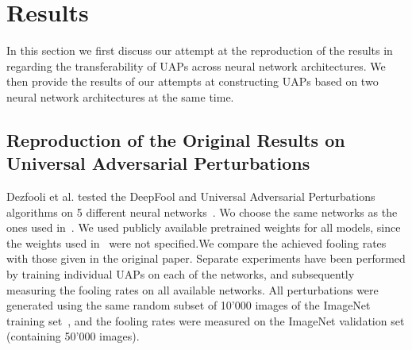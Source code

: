 \documentclass[runningheads]{llncs}
\begin{document}
\section{Results}\label{sec:Results}
In this section we first discuss our attempt at the reproduction of the results in~\cite{moosavidezfooli_universal_2017} regarding the transferability of UAPs across neural network architectures. We then provide the results of our attempts at constructing UAPs based on two neural network architectures at the same time.

\subsection{Reproduction of the Original Results on Universal Adversarial Perturbations}
Dezfooli et al. tested the DeepFool and Universal Adversarial Perturbations algorithms on 5 different neural networks~\cite{moosavidezfooli_universal_2017}. 
Wo choose the same networks as the ones used in~\cite{moosavidezfooli_universal_2017}. We used publicly available pretrained weights for all models, since the weights used in~\cite{moosavidezfooli_universal_2017} were not specified.We compare the achieved fooling rates with those given in the original paper. Separate experiments have been performed by training individual UAPs on each of the networks, and subsequently measuring the fooling rates on all available networks. All perturbations were generated using the same random subset of 10'000 images of the ImageNet training set~\cite{imagenet_cvpr09}, and the fooling rates were measured on the ImageNet validation set (containing 50'000 images).
\end{document}
